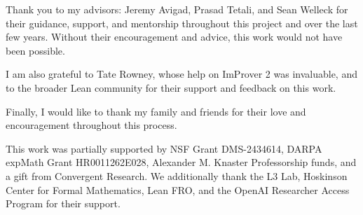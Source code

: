 Thank you to my advisors: Jeremy Avigad, Prasad Tetali, and Sean Welleck for their guidance, support, and mentorship throughout this project and over the last few years. Without their encouragement and advice, this work would not have been possible. 

I am also grateful to Tate Rowney, whose help on ImProver 2 was invaluable, and to the broader Lean community for their support and feedback on this work. 

Finally, I would like to thank my family and friends for their love and encouragement throughout this process.


This work was partially supported by NSF Grant DMS-2434614, DARPA expMath Grant HR0011262E028, Alexander M. Knaster Professorship funds, and a gift from Convergent Research. We additionally thank the L3 Lab, Hoskinson Center for Formal Mathematics, Lean FRO, and the OpenAI Researcher Access Program for their support.

